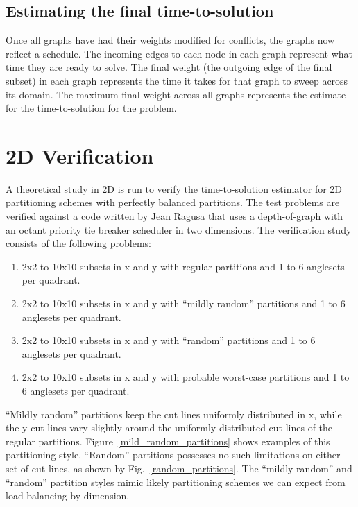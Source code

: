 \subsection{Estimating the final time-to-solution}

Once all graphs have had their weights modified for conflicts, the graphs now reflect a schedule. The incoming edges to each node in each graph represent what time they are ready to solve. The final weight (the outgoing edge of the final subset) in each graph represents the time it takes for that graph to sweep across its domain. The maximum final weight across all graphs represents the estimate for the time-to-solution for the problem.

\section{2D Verification}

A theoretical study in 2D is run to verify the time-to-solution estimator for 2D partitioning schemes with perfectly balanced partitions. The test problems are verified against a code written by Jean Ragusa that uses a depth-of-graph with an octant priority tie breaker scheduler in two dimensions. The verification study consists of the following problems:
\begin{enumerate}
	\item 2x2 to 10x10 subsets in x and y with regular partitions and 1 to 6 anglesets per quadrant.
	\item 2x2 to 10x10 subsets in x and y with ``mildly random'' partitions and 1 to 6 anglesets per quadrant.
	\item  2x2 to 10x10 subsets in x and y with ``random'' partitions and 1 to 6 anglesets per quadrant.
	\item  2x2 to 10x10 subsets in x and y with probable worst-case partitions and 1 to 6 anglesets per quadrant.
\end{enumerate}

``Mildly random'' partitions keep the cut lines uniformly distributed in x, while the y cut lines vary slightly around the uniformly distributed cut lines of the regular partitions. Figure~\ref{mild_random_partitions} shows examples of this partitioning style. ``Random'' partitions possesses no such limitations on either set of cut lines, as shown by Fig.~\ref{random_partitions}. The ``mildly random'' and ``random'' partition styles mimic likely partitioning schemes we can expect from load-balancing-by-dimension.


